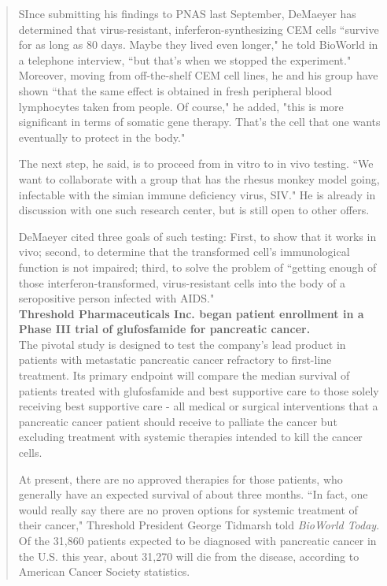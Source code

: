 \begin{singlespace}
\begin{small}
\begin{quotation}
SInce submitting his findings to PNAS last September, DeMaeyer has determined that virus-resistant, inferferon-synthesizing CEM cells ``survive for as long as 80 days. Maybe they lived even longer," he told BioWorld in a telephone interview, ``but that's when we stopped the experiment." Moreover, moving from off-the-shelf CEM cell lines, he and his group have shown ``that the same effect is obtained in fresh peripheral blood lymphocytes taken from people. Of course," he added, "this is more
significant in terms of somatic gene therapy. That's the cell that one wants eventually to protect in the body."

The next step, he said, is to proceed from in vitro to in vivo testing. ``We want to collaborate with a group that has the rhesus monkey model going, infectable with the simian immune deficiency virus, SIV." He is already in discussion with one such research center, but is still open to other offers.

DeMaeyer cited three goals of such testing: First, to show that it works in vivo; second, to determine that the transformed cell's
immunological function is not impaired; third, to solve the problem of ``getting enough of those interferon-transformed, virus-resistant cells into the body of a seropositive person infected with AIDS."\\

\noindent \textbf{Threshold Pharmaceuticals Inc. began patient enrollment in a Phase III trial of glufosfamide for pancreatic cancer.} \\

The pivotal study is designed to test the company's lead product in patients with metastatic pancreatic cancer refractory to first-line treatment. Its primary endpoint will compare the median survival of patients treated with glufosfamide and best supportive care to those solely receiving best supportive care - all medical or surgical interventions that a pancreatic cancer patient should receive to palliate the cancer but excluding treatment with systemic therapies intended to kill the cancer cells.

At present, there are no approved therapies for those patients, who generally have an expected survival of about three months. ``In fact, one would really say there are no proven options for systemic treatment of their cancer," Threshold President George Tidmarsh told \emph{BioWorld Today}. Of the 31,860 patients expected to be diagnosed with pancreatic cancer in the U.S. this year, about 31,270 will die from the disease, according to American Cancer Society statistics.


\end{quotation}
\end{small}
\end{singlespace}
